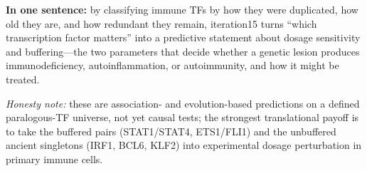 \documentclass[11pt]{article}
\begin{document}
\noindent\textbf{In one sentence:} by classifying immune TFs by how they were duplicated, how
old they are, and how redundant they remain, iteration15 turns ``which transcription factor
matters'' into a predictive statement about dosage sensitivity and buffering---the two
parameters that decide whether a genetic lesion produces immunodeficiency, autoinflammation,
or autoimmunity, and how it might be treated.

\medskip\noindent
\emph{Honesty note:} these are association- and evolution-based predictions on a defined
paralogous-TF universe, not yet causal tests; the strongest translational payoff is to take
the buffered pairs (STAT1/STAT4, ETS1/FLI1) and the unbuffered ancient singletons (IRF1,
BCL6, KLF2) into experimental dosage perturbation in primary immune cells.
\end{document}
